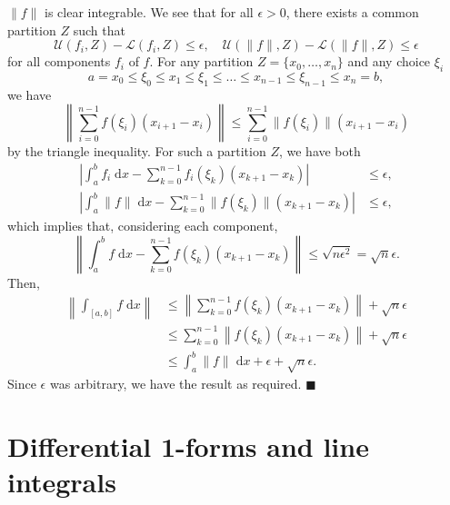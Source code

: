 \documentclass[letter-paper]{tufte-book}
\newenvironment{proof}[1][Proof]{\begin{trivlist}
\item[\hskip \labelsep {\bfseries #1}]}{\end{trivlist}}
\newcommand{\qed}{\hfill$\blacksquare$}
\begin{document}
\begin{proof}
  $\|f\|$ is clear integrable. We see that for all $\epsilon>0$, there exists a
  common partition $Z$ such that
  \begin{equation*}
    \mathcal{U}(f_i, Z) - \mathcal{L}(f_i, Z) \leq \epsilon, \quad \mathcal{U}(\|f\|, Z) - \mathcal{L}(\|f\|, Z) \leq \epsilon
  \end{equation*}
  for all components $f_i$ of $f$. For any partition $Z = \{x_0, \ldots, x_n\}$
  and any choice $\xi_i$
  \begin{equation*}
    a = x_0 \leq \xi_0 \leq x_1 \leq \xi_1 \leq \ldots \leq x_{n-1} \leq \xi_{n-1} \leq x_n = b,
  \end{equation*}
  we have
  \begin{equation*}
    \left\|\sum_{i=0}^{n-1} f(\xi_i)(x_{i+1} - x_i) \right\| \leq \sum_{i=0}^{n-1} \|f(\xi_i)\|(x_{i+1} - x_i)
  \end{equation*}
  by the triangle inequality. For such a partition $Z$, we have both
  \begin{align*}
    \left| \int_a^b f_i\; \mathrm{d}x - \sum_{k=0}^{n-1} f_i(\xi_k)(x_{k+1} - x_k)\right| &\leq \epsilon,\\
    \left| \int_a^b \|f\|\; \mathrm{d}x - \sum_{k=0}^{n-1} \|f(\xi_k)\|(x_{k+1} - x_k)\right| &\leq \epsilon,
  \end{align*}
  which implies that, considering each component,
  \begin{equation*}
    \left\| \int_a^b f\; \mathrm{d}x - \sum_{k=0}^{n-1} f(\xi_k)(x_{k+1} - x_k) \right\| \leq \sqrt{n\epsilon^2} = \sqrt{n} \epsilon.
  \end{equation*}
  Then,
  \begin{align*}
    \left\|\int_{[a,b]} f\; \mathrm{d}x \right\| &\leq \left\|\sum_{k=0}^{n-1} f(\xi_k)(x_{k+1} - x_k) \right\| + \sqrt{n} \epsilon \\
      &\leq \sum_{k=0}^{n-1}\left\| f(\xi_k)(x_{k+1} - x_k) \right\| + \sqrt{n} \epsilon\\
      &\leq \int_a^b \|f\|\; \mathrm{d}x + \epsilon + \sqrt{n}\epsilon.
  \end{align*}
  Since $\epsilon$ was arbitrary, we have the result as required. \qed
\end{proof}


\section{Differential 1-forms and line integrals}
\end{document}
